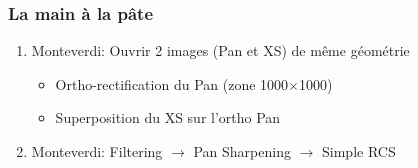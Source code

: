 \documentclass[compress,handout]{beamer}
\begin{document}
\begin{frame}
\frametitle{La main à la pâte}
\begin{enumerate}
\item Monteverdi: Ouvrir 2 images (Pan et XS) de même géométrie
  \begin{itemize}
  \item Ortho-rectification du Pan (zone 1000$\times$1000)
  \item Superposition du XS sur l'ortho Pan
  \end{itemize}
\item Monteverdi: Filtering $\rightarrow$ Pan Sharpening $\rightarrow$
  Simple RCS
\end{enumerate}
\end{frame}
\end{document}

